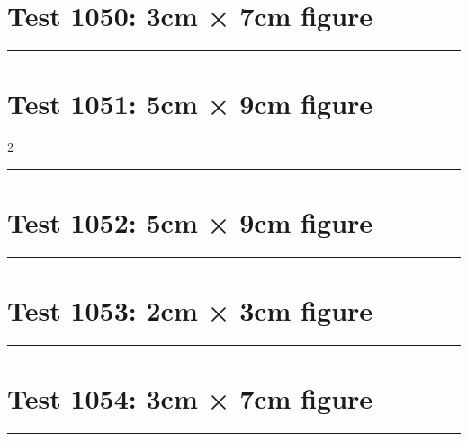\documentclass[a4paper,11pt]{article}
\begin{document}
\section*{Test 1050: 3cm × 7cm figure}
\begin{swarmwrap}%
  \begin{minipage}[t]{3cm}
    \centering
    \rule{\linewidth}{7cm}
  \end{minipage}%
\end{swarmwrap}%
\swarmwrapnext
\lipsum[59]
\lipsum[60]
\lipsum[61]
\section*{Test 1051: 5cm × 9cm figure}
\begin{multicols}{2}
  \begin{swarmwrap}%
    \begin{minipage}[t]{5cm}
      \centering
      \rule{\linewidth}{9cm}
    \end{minipage}%
  \end{swarmwrap}%
  \swarmwrapnext
  \lipsum[145]
  \lipsum[146]
  \lipsum[147]
  \lipsum[148]
  \lipsum[149]
\end{multicols}
\section*{Test 1052: 5cm × 9cm figure}
\begin{swarmwrap}%
  \begin{minipage}[t]{5cm}
    \centering
    \rule{\linewidth}{9cm}
  \end{minipage}%
\end{swarmwrap}%
\swarmwrapnext
\lipsum[117]
\lipsum[118]
\lipsum[119]
\lipsum[120]
\lipsum[121]
\section*{Test 1053: 2cm × 3cm figure}
\begin{swarmwrap}%
  \begin{minipage}[t]{2cm}
    \centering
    \rule{\linewidth}{3cm}
  \end{minipage}%
\end{swarmwrap}%
\swarmwrapnext
\lipsum[2]
\lipsum[3]
\lipsum[4]
\lipsum[5]
\section*{Test 1054: 3cm × 7cm figure}
\begin{swarmwrap}%
  \begin{minipage}[t]{3cm}
    \centering
    \rule{\linewidth}{7cm}
  \end{minipage}%
\end{swarmwrap}%
\swarmwrapnext
\lipsum[142]
\lipsum[143]
\lipsum[144]
\lipsum[145]
\lipsum[146]
\end{document}
